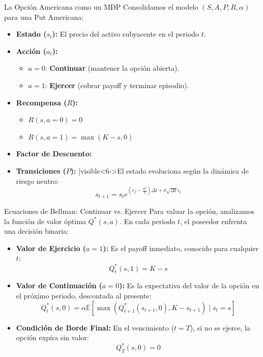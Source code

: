 \documentclass[xcolor=dvipsnames, handout]{beamer}
\begin{document}
\begin{frame}{La Opci\'on Americana como un MDP}
Consolidamos el modelo $(S, A, P, R, \alpha)$ para una Put Americana:

\begin{itemize}
    \item \textbf{Estado ($s_t$):}  {El precio del activo subyacente en el periodo $t$.}
    \item \textbf{Acci\'on ($a_t$):} 
        \begin{itemize}
            \item<3-> $a=0$: \textbf{Continuar} (mantener la opci\'on abierta).
            \item<3-> $a=1$: \textbf{Ejercer} (cobrar payoff y terminar episodio).
        \end{itemize}
    \item \textbf{Recompensa ($R$):}
        \begin{itemize}
            \item<4-> $R(s, a=0) = 0$
            \item<4-> $R(s, a=1) = \max(K - s, 0)$
        \end{itemize}
    \item \textbf{Factor de Descuento:} 
    \item \textbf{Transiciones ($P$):} ]visible<6->{El estado evoluciona seg\'un la din\'amica de riesgo neutro:
    \[ s_{t+1} = s_t e^{(r_f - \frac{\sigma^2}{2})\Delta t + \sigma \sqrt{\Delta t} \epsilon_t} \]}
\end{itemize}

\end{frame}

\begin{frame}{Ecuaciones de Bellman: Continuar vs. Ejercer}
Para valuar la opci\'on, analizamos la funci\'on de valor óptima $Q^*(s,a)$. En cada periodo $t$, el poseedor enfrenta una decisión binaria:

\begin{itemize}
    \item \textbf{Valor de Ejercicio ($a=1$):} Es el payoff inmediato, conocido para cualquier $t$:
    \[ Q_t^*(s,1) = K - s \]
    
    \item<2-> \textbf{Valor de Continuaci\'on ($a=0$):} Es la expectativa del valor de la opci\'on en el próximo periodo, descontada al presente:
    \[ Q_t^*(s,0) = \alpha \mathbb{E} \left[ \max\left( Q_{t+1}^*(s_{t+1}, 0), K - s_{t+1} \right) \mid s_t = s \right] \]
    
    \item<3-> \textbf{Condici\'on de Borde Final:} En el vencimiento ($t=T$), si no se ejerce, la opci\'on expira sin valor:
    \[ Q_T^*(s,0) = 0 \]
\end{itemize}
\end{frame}
\end{document}
